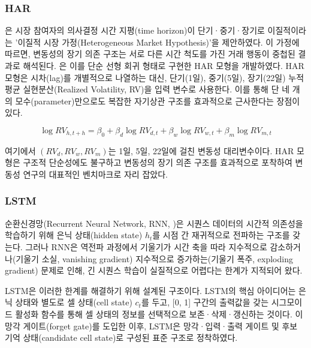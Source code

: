 \documentclass[eng]{kjas3}
\begin{document}
\subsubsection{HAR}
\label{subsubsec:har_review}

\citet{muller1997}은 시장 참여자의 의사결정 시간 지평(time horizon)이 단기·중기·장기로 이질적이라는 '이질적 시장 가정(Heterogeneous Market Hypothesis)'을 제안하였다. 이 가정에 따르면, 변동성의 장기 의존 구조는 서로 다른 시간 척도를 가진 거래 행동이 중첩된 결과로 해석된다. 
\citet{corsi2009}은 이를 단순 선형 회귀 형태로 구현한 HAR 모형을 개발하였다. HAR 모형은 시차(lag)를 개별적으로 나열하는 대신, 단기(1일), 중기(5일), 장기(22일) 누적 평균 실현분산(Realized Volatility, RV)을 입력 변수로 사용한다. 이를 통해 단 네 개의 모수(parameter)만으로도 복잡한 자기상관 구조를 효과적으로 근사한다는 장점이 있다.

\begin{equation}
\log RV_{h,t+h} = \beta_0 + \beta_d \log RV_{d,t} + \beta_w \log RV_{w,t} + \beta_m \log RV_{m,t} \label{eq:har_full}
\end{equation}

여기에서 $(RV_d, RV_w, RV_m)$는 1일, 5일, 22일에 걸친 변동성 대리변수이다. HAR 모형은 구조적 단순성에도 불구하고 변동성의 장기 의존 구조를 효과적으로 포착하여 변동성 연구의 대표적인 벤치마크로 자리 잡았다.

\subsubsection{LSTM}
\label{subsubsec:lstm_review}

순환신경망(Recurrent Neural Network, RNN, \citealp{rumelhart1986learning})은 시퀀스 데이터의 시간적 의존성을 학습하기 위해 은닉 상태(hidden state) $h_t$를 시점 간 재귀적으로 전파하는 구조를 갖는다. 그러나 RNN은 역전파 과정에서 기울기가 시간 축을 따라 지수적으로 감소하거나(기울기 소실, vanishing gradient) 지수적으로 증가하는(기울기 폭주, exploding gradient) 문제로 인해, 긴 시퀀스 학습이 실질적으로 어렵다는 한계가 지적되어 왔다.

LSTM\citep{hochreiter1997}은 이러한 한계를 해결하기 위해 설계된 구조이다. LSTM의 핵심 아이디어는 은닉 상태와 별도로 셀 상태(cell state) $c_t$를 두고, [0, 1] 구간의 출력값을 갖는 시그모이드 활성화 함수를 통해 셀 상태의 정보를 선택적으로 보존·삭제·갱신하는 것이다. \citet{gers2000}이 망각 게이트(forget gate)를 도입한 이후, LSTM은 망각·입력·출력 게이트 및 후보 기억 상태(candidate cell state)로 구성된 표준 구조로 정착하였다.
\end{document}
